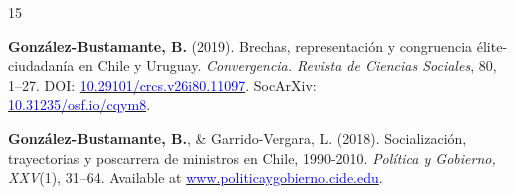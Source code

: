 \begin{publications}
\begin{benumerate}{15}
\item{{\bfseries González-Bustamante, B.} (2019). Brechas, representación y congruencia élite-ciudadanía en Chile y Uruguay. {\itshape Convergencia. Revista de Ciencias Sociales}, 80, 1--27. DOI: \href{https://doi.org/10.29101/crcs.v26i80.11097}{\textcolor{blue}{10.29101/crcs.v26i80.11097}}. SocArXiv: \\ \href{https://doi.org/10.31235/osf.io/cqym8}{\textcolor{blue}{10.31235/osf.io/cqym8}}.}\vspace{1mm} %


\item{{\bfseries González-Bustamante, B.}, \& Garrido-Vergara, L. (2018). Socialización, trayectorias y poscarrera de ministros en Chile, 1990-2010. {\itshape Política y Gobierno, XXV}(1), 31--64. Available at \href{http://www.politicaygobierno.cide.edu/index.php/pyg/article/view/1080}{\textcolor{blue}{www.politicaygobierno.cide.edu}}.}\vspace{1mm}

\end{benumerate}

\end{publications}


